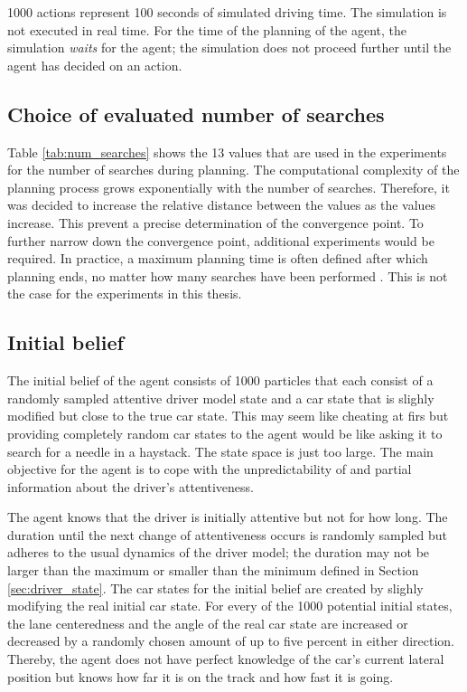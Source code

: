 1000 actions represent 100 seconds of simulated driving time. The simulation is not executed in real time. For the time of the planning of the agent, the simulation \emph{waits} for the agent; the simulation does not proceed further until the agent has decided on an action. 

\subsection{Choice of evaluated number of searches}



Table \ref{tab:num_searches} shows the 13 values that are used in the experiments for the number of searches during planning. The computational complexity of the planning process grows exponentially with the number of searches. Therefore, it was decided to increase the relative distance between the values as the values increase. This prevent a precise determination of the convergence point. To further narrow down the convergence point, additional experiments would be required. In practice, a maximum planning time is often defined after which planning ends, no matter how many searches have been performed \parencite{pomcp}. This is not the case for the experiments in this thesis.

\subsection{Initial belief}

The initial belief of the agent consists of 1000 particles that each consist of a randomly sampled attentive driver model state and a car state that is slighly modified but close to the true car state. This may seem like cheating at firs but providing completely random car states to the agent would be like asking it to search for a needle in a haystack. The state space is just too large. The main objective for the agent is to cope with the unpredictability of and partial information about the driver's attentiveness.

The agent knows that the driver is initially attentive but not for how long. The duration until the next change of attentiveness occurs is randomly sampled but adheres to the usual dynamics of the driver model; the duration may not be larger than the maximum or smaller than the minimum defined in Section \ref{sec:driver_state}. The car states for the initial belief are created by slighly modifying the real initial car state. For every of the 1000 potential initial states, the lane centeredness and the angle of the real car state are increased or decreased by a randomly chosen amount of up to five percent in either direction. Thereby, the agent does not have perfect knowledge of the car's current lateral position but knows how far it is on the track and how fast it is going.

